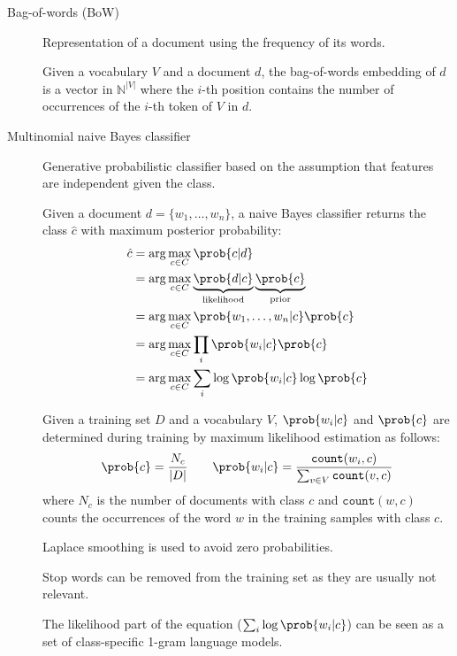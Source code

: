 \begin{description}
    \item[Bag-of-words (BoW)] 
        Representation of a document using the frequency of its words.

        Given a vocabulary $V$ and a document $d$, the bag-of-words embedding of $d$ is a vector in $\mathbb{N}^{\vert V \vert}$ where the $i$-th position contains the number of occurrences of the $i$-th token of $V$ in $d$.

    \item[Multinomial naive Bayes classifier] 
        Generative probabilistic classifier based on the assumption that features are independent given the class.

        Given a document $d = \{ w_1, \dots, w_n \}$, a naive Bayes classifier returns the class $\hat{c}$ with maximum posterior probability:
        \[
            \begin{split}
                \hat{c} &= \arg\max_{c \in C} \prob{c | d} \\
                &= \arg\max_{c \in C} \underbrace{\prob{d | c}}_{\text{likelihood}} \underbrace{\prob{c}}_{\text{prior}} \\
                &= \arg\max_{c \in C} \prob{w_1, \dots, w_n | c} \prob{c} \\
                &= \arg\max_{c \in C} \prod_{i} \prob{w_i | c} \prob{c} \\
                &= \arg\max_{c \in C} \sum_{i} \log\prob{w_i | c} \log\prob{c} \\
            \end{split}
        \]

        Given a training set $D$ and a vocabulary $V$, $\prob{w_i | c}$ and $\prob{c}$ are determined during training by maximum likelihood estimation as follows:
        \[
            \prob{c} = \frac{N_c}{\vert D \vert}
            \qquad
            \prob{w_i | c} = \frac{\texttt{count}(w_i, c)}{\sum_{v \in V} \texttt{count}(v, c)}
        \]
        where $N_c$ is the number of documents with class $c$ and $\texttt{count}(w, c)$ counts the occurrences of the word $w$ in the training samples with class $c$.

        \begin{remark}
            Laplace smoothing is used to avoid zero probabilities.
        \end{remark}

        \begin{remark}
            Stop words can be removed from the training set as they are usually not relevant.
        \end{remark}

        \begin{remark}
            The likelihood part of the equation ($\sum_{i} \log\prob{w_i | c}$) can be seen as a set of class-specific 1-gram language models.
        \end{remark}
\end{description}

